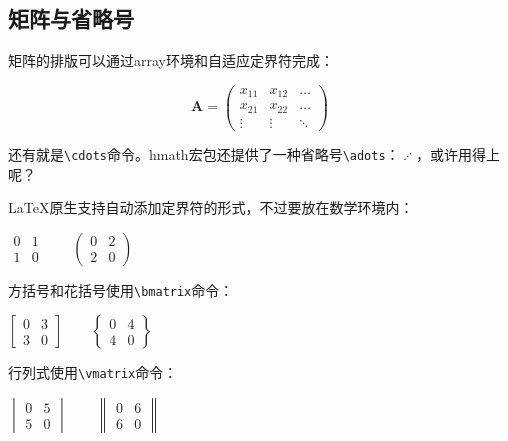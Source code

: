 {\subsection{矩阵与省略号}
矩阵的排版可以通过array环境和自适应定界符完成：

\begin{codeshow}
\[\mathbf{A}=
\left(\begin{array}{ccc}
x_{11} & x_{12} & \ldots \\
x_{21} & x_{22} & \ldots \\
\vdots & \vdots & \ddots
\end{array}\right)\]
\end{codeshow}

还有就是\verb|\cdots|命令。hmath宏包还提供了一种省略号\verb|\adots|：$\adots$，或许用得上呢？

\LaTeX 原生支持自动添加定界符的形式，不过要放在数学环境内：

\begin{codeshow}
\centering $\begin{matrix}
0 & 1 \\ 1 & 0 \end{matrix}\qquad
\begin{pmatrix} 0 & 2 \\
2 & 0 \end{pmatrix}$
\end{codeshow}

方括号和花括号使用\verb|\bmatrix|命令：

\begin{codeshow}
\centering $\begin{bmatrix}
0 & 3 \\ 3 & 0 \end{bmatrix}\qquad
\begin{Bmatrix} 0 & 4 \\
4 & 0 \end{Bmatrix}$
\end{codeshow}

行列式使用\verb|\vmatrix|命令：

\begin{codeshow}
\centering $\begin{vmatrix}
0 & 5 \\ 5 & 0 \end{vmatrix}\qquad
\begin{Vmatrix} 0 & 6 \\
6 & 0 \end{Vmatrix}$
\end{codeshow}

}

